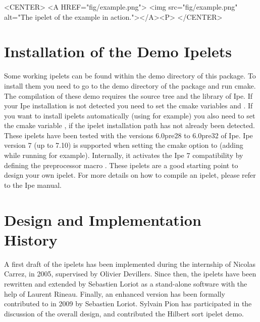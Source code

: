 \begin{ccHtmlOnly}
    <CENTER>
    <A HREF="fig/example.png">
        <img src="fig/example.png" alt="The ipelet of the example in action."></A><P>
    </CENTER>
\end{ccHtmlOnly}


\section{Installation of the Demo Ipelets}
Some working ipelets can be found within
the demo directory of this package. To install them you need
to go to the demo directory of the package and run cmake.
The compilation of these demo requires the source tree and the library of Ipe.
If your Ipe installation is not detected you need to set the cmake
variables  and . If you want
to install ipelets automatically (using  for example)
you also need to set the cmake variable , 
if the ipelet installation path has not already been detected.
These ipelets have been tested with the versions 6.0pre28 to 6.0pre32 of Ipe.
Ipe version 7 (up to 7.10) is supported when setting the cmake option  to 
(adding  while running  for example).
Internally, it activates the Ipe 7 compatibility by defining the preprocessor macro .
These ipelets are a good starting point to design your own ipelet. For more details on how
to compile an ipelet, please refer to the Ipe manual.



\section{Design and Implementation History}
A first draft of the \cgal{} ipelets has been implemented during the
internship of Nicolas Carrez, in 2005, supervised by Olivier Devillers.
Since then, the ipelets have been rewritten and extended by Sebastien
Loriot as a stand-alone software with the help of Laurent Rineau.
Finally, an enhanced version has been formally contributed to \cgal{} in 2009
by Sebastien Loriot. Sylvain Pion has participated in the discussion
of the overall design, and contributed the Hilbert sort ipelet demo.
